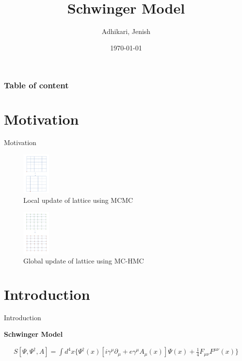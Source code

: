 \documentclass[10pt]{beamer}
\author{Adhikari, Jenish}
\title{Schwinger Model}
\date{\today}
\institute{Universität Bonn}
\begin{document}
  \begin{frame}[plain]
    \titlepage
  \end{frame}
  \begin{frame}
    \frametitle{Table of content}
    \tableofcontents
  \end{frame}
\section{Motivation}
\begin{frame}{Motivation}
    \begin{figure}
        \centering
        \includegraphics[width=0.125\textwidth]{local_update.png}
        \caption{Local update of lattice using MCMC}
    \end{figure}
    \begin{figure}
        \centering
        \includegraphics[width=0.125\textwidth]{global_update.png}
        \caption{Global update of lattice using MC-HMC}
    \end{figure}
\end{frame}


 \section{Introduction}
 \begin{frame}{Introduction}
  \begin{center} \textbf{Schwinger Model}\end{center}
 \begin{align}
     S[\Psi,\Psi^{\dagger},A] = \int{d^4x \{\Psi^\dagger(x)\left[i\gamma^\mu\partial_\mu +e\gamma^\mu A_\mu(x) \right]\Psi(x) +\frac{1}{4} F_{\mu\nu}F^{\mu\nu}(x) \}}
 \end{align}
     
 \end{frame}
\end{document}
